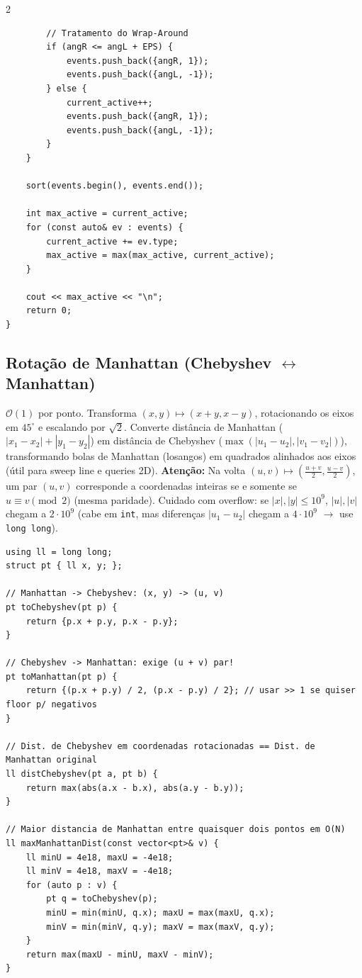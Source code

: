 \documentclass[11pt]{article}
\begin{document}
\begin{multicols}{2}
\begin{lstlisting}
        // Tratamento do Wrap-Around
        if (angR <= angL + EPS) {
            events.push_back({angR, 1});
            events.push_back({angL, -1});
        } else {
            current_active++;
            events.push_back({angR, 1});
            events.push_back({angL, -1});
        }
    }

    sort(events.begin(), events.end());

    int max_active = current_active;
    for (const auto& ev : events) {
        current_active += ev.type;
        max_active = max(max_active, current_active);
    }

    cout << max_active << "\n";
    return 0;
}
\end{lstlisting}

\subsection{Rotação de Manhattan (Chebyshev $\leftrightarrow$ Manhattan)}
$\mathcal{O}(1)$ por ponto. Transforma $(x, y) \mapsto (x + y, x - y)$, rotacionando os eixos em $45^\circ$ e escalando por $\sqrt{2}$. Converte distância de Manhattan ($|x_1 - x_2| + |y_1 - y_2|$) em distância de Chebyshev ($\max(|u_1 - u_2|, |v_1 - v_2|)$), transformando bolas de Manhattan (losangos) em quadrados alinhados aos eixos (útil para sweep line e queries 2D). \textbf{Atenção:} Na volta $(u, v) \mapsto (\frac{u+v}{2}, \frac{u-v}{2})$, um par $(u, v)$ corresponde a coordenadas inteiras se e somente se $u \equiv v \pmod 2$ (mesma paridade). Cuidado com overflow: se $|x|, |y| \le 10^9$, $|u|, |v|$ chegam a $2 \cdot 10^9$ (cabe em \texttt{int}, mas diferenças $|u_1 - u_2|$ chegam a $4 \cdot 10^9$ $\rightarrow$ use \texttt{long long}).
\begin{lstlisting}
using ll = long long;
struct pt { ll x, y; };

// Manhattan -> Chebyshev: (x, y) -> (u, v)
pt toChebyshev(pt p) {
    return {p.x + p.y, p.x - p.y};
}

// Chebyshev -> Manhattan: exige (u + v) par!
pt toManhattan(pt p) {
    return {(p.x + p.y) / 2, (p.x - p.y) / 2}; // usar >> 1 se quiser floor p/ negativos
}

// Dist. de Chebyshev em coordenadas rotacionadas == Dist. de Manhattan original
ll distChebyshev(pt a, pt b) {
    return max(abs(a.x - b.x), abs(a.y - b.y));
}

// Maior distancia de Manhattan entre quaisquer dois pontos em O(N)
ll maxManhattanDist(const vector<pt>& v) {
    ll minU = 4e18, maxU = -4e18;
    ll minV = 4e18, maxV = -4e18;
    for (auto p : v) {
        pt q = toChebyshev(p);
        minU = min(minU, q.x); maxU = max(maxU, q.x);
        minV = min(minV, q.y); maxV = max(maxV, q.y);
    }
    return max(maxU - minU, maxV - minV);
}
\end{lstlisting}


\end{multicols}
\end{document}
